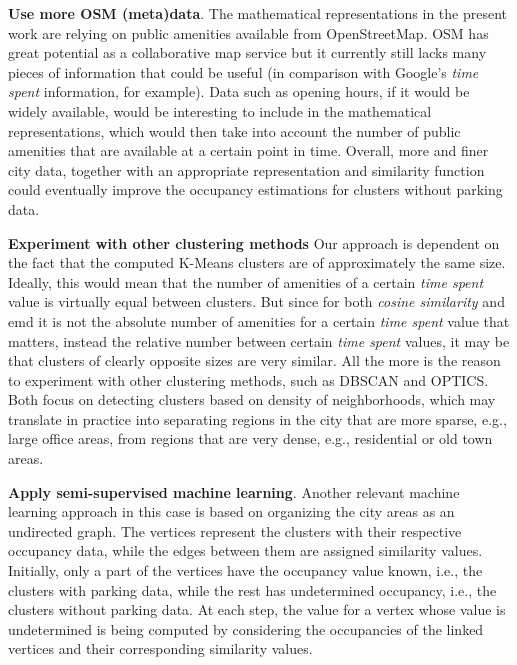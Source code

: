 \begin{romanlist}
		\item \textbf{Use more OSM (meta)data}.
		The mathematical representations in the present work are relying on public amenities available from OpenStreetMap.
		OSM has great potential as a collaborative map service but it currently still lacks many pieces of information that could be useful (in comparison with Google's \textit{time spent} information, for example).
		Data such as opening hours, if it would be widely available, would be interesting to include in the mathematical representations, which would then take into account the number of public amenities that are available at a certain point in time.
		Overall, more and finer city data, together with an appropriate representation and similarity function could eventually improve the occupancy estimations for clusters without parking data. 
		
		\item \textbf{Experiment with other clustering methods}
		Our approach is dependent on the fact that the computed K-Means clusters are of approximately the same size. Ideally, this would mean that the number of amenities of a certain \textit{time spent} value is virtually equal between clusters. But since for both \textit{cosine similarity} and emd it is not the absolute number of amenities for a certain \textit{time spent} value that matters, instead the relative number between certain \textit{time spent} values, it may be that clusters of clearly opposite sizes are very similar. All the more is the reason to experiment with other clustering methods, such as DBSCAN and OPTICS. Both focus on detecting clusters based on density of neighborhoods, which may translate in practice into separating regions in the city that are more sparse, e.g., large office areas, from regions that are very dense, e.g., residential or old town areas.
		
		\item \textbf{Apply semi-supervised machine learning}.
		Another relevant machine learning approach in this case is based on organizing the city areas as an undirected graph.
		The vertices represent the clusters with their respective occupancy data, while the edges between them are assigned similarity values.
		Initially, only a part of the vertices have the occupancy value known, i.e., the clusters with parking data, while the rest has undetermined occupancy, i.e., the clusters without parking data.
		At each step, the value for a vertex whose value is undetermined is being computed by considering the occupancies of the linked vertices and their corresponding similarity values.
		

\end{romanlist}
